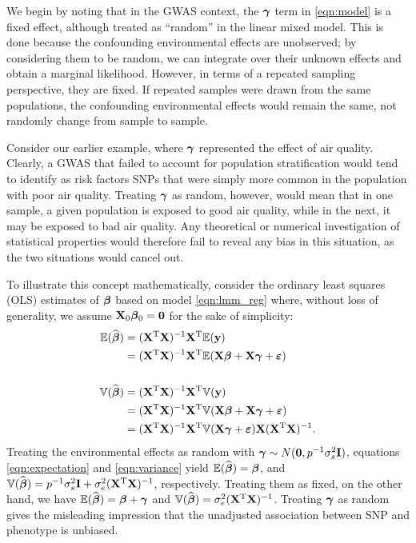 We begin by noting that in the GWAS context, the $\boldsymbol{\gamma}$ term in \eqref{eqn:model} is a fixed effect, although treated as ``random'' in the linear mixed model.  This is done because the confounding environmental effects are unobserved; by considering them to be random, we can integrate over their unknown effects and obtain a marginal likelihood.  However, in terms of a repeated sampling perspective, they are fixed.  If repeated samples were drawn from the same populations, the confounding environmental effects would remain the same, not randomly change from sample to sample.  

Consider our earlier example, where $\boldsymbol{\gamma}$ represented the effect of air quality.  Clearly, a GWAS that failed to account for population stratification would tend to identify as risk factors SNPs that were simply more common in the population with poor air quality.  Treating $\boldsymbol{\gamma}$ as random, however, would mean that in one sample, a given population is exposed to good air quality, while in the next, it may be exposed to bad air quality.  Any theoretical or numerical investigation of statistical properties would therefore fail to reveal any bias in this situation, as the two situations would cancel out.

To illustrate this concept mathematically, consider the ordinary least squares (OLS) estimates of $\boldsymbol{\beta}{}$ based on model \eqref{eqn:lmm_reg} where, without loss of generality, we assume $\mathbf{X}_0 \boldsymbol{\beta}{}_0 = \boldsymbol{0}$ for the sake of simplicity: 
\begin{align}
    \mathbb{E}(\widehat{\boldsymbol{\beta}{}}) &= (\mathbf{X}^{\text{T}} \mathbf{X})^{-1} \mathbf{X}^{\text{T}} \mathbb{E}(\mathbf{y}) \notag \\
    &=  (\mathbf{X}^{\text{T}} \mathbf{X})^{-1} \mathbf{X}^{\text{T}} \mathbb{E}(\mathbf{X}\boldsymbol{\beta}{} + \mathbf{X}\boldsymbol{\gamma} + \boldsymbol{\varepsilon}{}) \label{eqn:expectation}\\
    &\quad \notag\\
    \mathbb{V}(\widehat{\boldsymbol{\beta}{}}) &= (\mathbf{X}^{\text{T}} \mathbf{X})^{-1} \mathbf{X}^{\text{T}} \mathbb{V}(\mathbf{y}) \notag\\
    &=  (\mathbf{X}^{\text{T}} \mathbf{X})^{-1} \mathbf{X}^{\text{T}} \mathbb{V}(\mathbf{X}\boldsymbol{\beta}{} + \mathbf{X}\boldsymbol{\gamma} + \boldsymbol{\varepsilon}{}) \notag\\
    &=  (\mathbf{X}^{\text{T}} \mathbf{X})^{-1} \mathbf{X}^{\text{T}} \mathbb{V}(\mathbf{X}\boldsymbol{\gamma} + \boldsymbol{\varepsilon}{}) \mathbf{X}  (\mathbf{X}^{\text{T}} \mathbf{X})^{-1} \label{eqn:variance}.
\end{align}
Treating the environmental effects as random with $\boldsymbol{\gamma} \sim N(\boldsymbol{0}, p^{-1} \sigma^2_s \mathbf{I})$, equations \eqref{eqn:expectation} and \eqref{eqn:variance} yield $\mathbb{E}(\widehat{\boldsymbol{\beta}{}}) = \boldsymbol{\beta}{}$, and $\mathbb{V}(\widehat{\boldsymbol{\beta}{}}) = p^{-1}\sigma^2_s\mathbf{I} + \sigma^2_e (\mathbf{X}^{\text{T}} \mathbf{X})^{-1}$, respectively. Treating them as fixed, on the other hand, we have $\mathbb{E}(\widehat{\boldsymbol{\beta}{}}) = \boldsymbol{\beta}{} + \boldsymbol{\gamma}$ and $\mathbb{V}(\widehat{\boldsymbol{\beta}{}}) = \sigma^2_e (\mathbf{X}^{\text{T}} \mathbf{X})^{-1}$. Treating $\boldsymbol{\gamma}$ as random gives the misleading impression that the unadjusted association between SNP and phenotype is unbiased.

